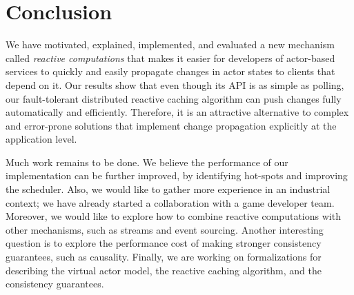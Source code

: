 \section{Conclusion}

We have motivated, explained, implemented, and evaluated a new mechanism called \emph{reactive computations} that makes it easier for developers of actor-based services to quickly and easily propagate changes in actor states to clients that depend on it. Our results show that even though its API is as simple as polling, our fault-tolerant distributed reactive caching algorithm can push changes fully automatically and efficiently. Therefore, it is an attractive alternative to complex and error-prone solutions that implement change propagation explicitly at the application level. 

Much work remains to be done. We believe the performance of our implementation can be further improved, by identifying hot-spots and improving the scheduler. Also, we would like to gather more experience in an industrial context; we have already started a collaboration with a game developer team. Moreover, we would like to explore how to combine reactive computations with other mechanisms, such as streams and event sourcing. Another interesting question is to explore the performance cost of making stronger consistency guarantees, such as causality. Finally, we are working on formalizations for describing the virtual actor model, the reactive caching algorithm, and the consistency guarantees.